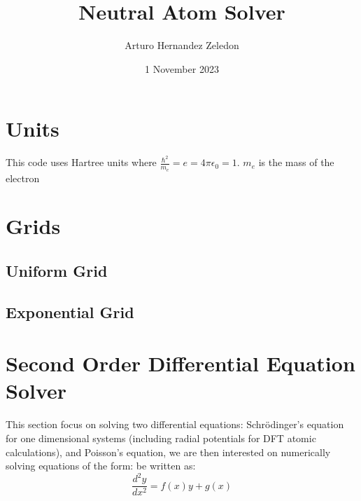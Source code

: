 \documentclass[11pt]{article}
\title{ Neutral Atom Solver}
\author{ Arturo Hernandez Zeledon }
\date{1 November 2023}
\begin{document}
\maketitle	
\pagebreak



\section{Units}
This code uses Hartree units where $\frac{\hbar^2}{m_e} = e = 4\pi\epsilon_0 = 1$. $m_e$
is the mass of the electron

\section{Grids}

\subsection{Uniform Grid}


\subsection{Exponential Grid}


\pagebreak
\section{Second Order Differential Equation Solver}
This section focus on solving two differential equations: Schrödinger's equation for one dimensional
systems (including radial potentials for DFT atomic calculations), and 
Poisson's equation, we are then interested on numerically solving equations of the form:
 be written as:
 \begin{equation}
    \label{eqn:general_second_order_diff}
    \frac{d^2y}{dx^2} = f(x)y + g(x)
 \end{equation}
\end{document}
